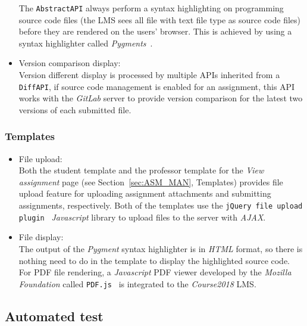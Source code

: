 \begin{itemize}
    The \texttt{AbstractAPI} always perform a
    syntax highlighting on programming source code files
    (the LMS sees all file with text file type as source code files)
    before they are rendered on the users' browser.
    This is achieved by
    using a syntax highlighter called \emph{Pygments}~\cite{pygments}.

    \item Version comparison display: \\
    Version different display is processed by multiple APIs inherited from a
    \texttt{DiffAPI}, if source code management is enabled for an assignment,
    this API works with the \emph{GitLab} server to provide version comparison
    for the latest two versions of each submitted file.
\end{itemize}

\subsubsection{Templates}
\begin{itemize}
    \item File upload: \\
        Both the student template and the professor template for the
        \emph{View assignment} page (see Section~\ref{sec:ASM_MAN}, Templates)
        provides file upload feature for uploading
        assignment attachments and submitting assignments, respectively.
        Both of the templates use the
        \texttt{jQuery file upload plugin}~\citep[Section Description]{jqFileUpload}
        \emph{Javascript} library to upload files to the server with
        \emph{AJAX}.
    \item File display: \\
        The output of the \emph{Pygment} syntax highlighter is in \emph{HTML}
        format, so there is nothing need to do in the template to display the
        highlighted source code.
        For PDF file rendering, a \emph{Javascript} PDF viewer developed
        by the \emph{Mozilla Foundation} called \texttt{PDF.js}~\cite{pdfjs}
        is integrated to the \emph{Course2018} LMS.
\end{itemize}





\subsection{Automated test}
\label{sec:AUTO_TEST}

